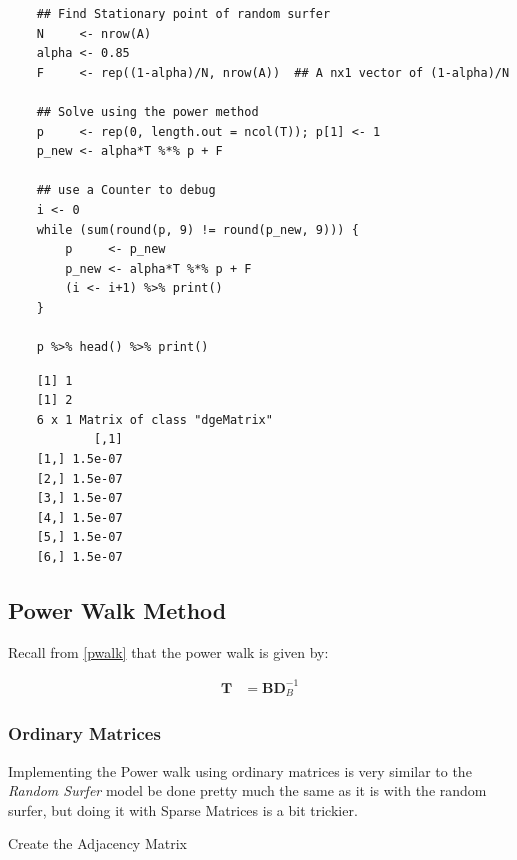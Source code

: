 \documentclass[11pt]{report}
\begin{document}
\begin{tcolorbox}
    \begin{verbatim}
    ## Find Stationary point of random surfer
    N     <- nrow(A)
    alpha <- 0.85
    F     <- rep((1-alpha)/N, nrow(A))  ## A nx1 vector of (1-alpha)/N

    ## Solve using the power method
    p     <- rep(0, length.out = ncol(T)); p[1] <- 1
    p_new <- alpha*T %*% p + F

    ## use a Counter to debug
    i <- 0
    while (sum(round(p, 9) != round(p_new, 9))) {
        p     <- p_new
        p_new <- alpha*T %*% p + F
        (i <- i+1) %>% print()
    }

    p %>% head() %>% print()
    \end{verbatim}
\tcblower
    \begin{verbatim}
    [1] 1
    [1] 2
    6 x 1 Matrix of class "dgeMatrix"
            [,1]
    [1,] 1.5e-07
    [2,] 1.5e-07
    [3,] 1.5e-07
    [4,] 1.5e-07
    [5,] 1.5e-07
    [6,] 1.5e-07
    \end{verbatim}
\end{tcolorbox}

\subsection{Power Walk Method}
\label{sec:org97c1330}
Recall from \ref{pwalk} that the power walk is given by:

\begin{align*}
\mathbf{T} &= \mathbf{B} \mathbf{D}^{-1}_{B}
\end{align*}
\subsubsection{Ordinary Matrices}
\label{sec:org3f6b537}
Implementing the Power walk using ordinary matrices is very similar to the \emph{Random Surfer} model be done pretty much the same as it is with the random surfer, but doing it with Sparse Matrices is a bit trickier.

Create the Adjacency Matrix
\end{document}
